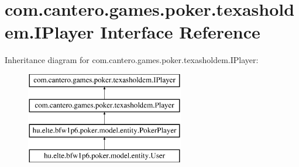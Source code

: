 \hypertarget{interfacecom_1_1cantero_1_1games_1_1poker_1_1texasholdem_1_1_i_player}{}\section{com.\+cantero.\+games.\+poker.\+texasholdem.\+I\+Player Interface Reference}
\label{interfacecom_1_1cantero_1_1games_1_1poker_1_1texasholdem_1_1_i_player}
Inheritance diagram for com.\+cantero.\+games.\+poker.\+texasholdem.\+I\+Player\+:\begin{figure}[H]
\begin{center}
\leavevmode
\includegraphics[height=4.000000cm]{interfacecom_1_1cantero_1_1games_1_1poker_1_1texasholdem_1_1_i_player}
\end{center}
\end{figure}

